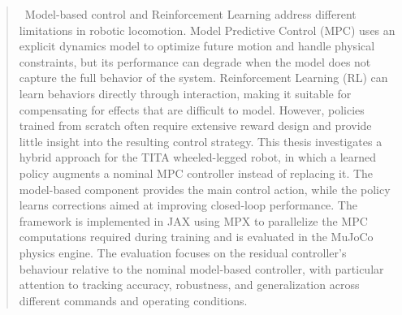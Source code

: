 \begin{abstract}
\
Model-based control and Reinforcement Learning address different limitations in
robotic locomotion. Model Predictive Control (MPC) uses an explicit dynamics
model to optimize future motion and handle physical constraints, but its
performance can degrade when the model does not capture the full behavior of the
system. Reinforcement Learning (RL) can learn behaviors directly through
interaction, making it suitable for compensating for effects that are difficult
to model. However, policies trained from scratch often require extensive reward
design and provide little insight into the resulting control strategy. This
thesis investigates a hybrid approach for the TITA wheeled-legged robot, in
which a learned policy augments a nominal MPC controller instead of replacing
it. The model-based component provides the main control action, while the policy
learns corrections aimed at improving closed-loop performance. The framework
is implemented in JAX using MPX to parallelize the MPC computations required
during training and is evaluated in the MuJoCo physics engine. The evaluation
focuses on the residual controller's behaviour relative to the nominal
model-based controller, with particular attention to tracking accuracy,
robustness, and generalization across different commands and operating
conditions.

\end{abstract}
